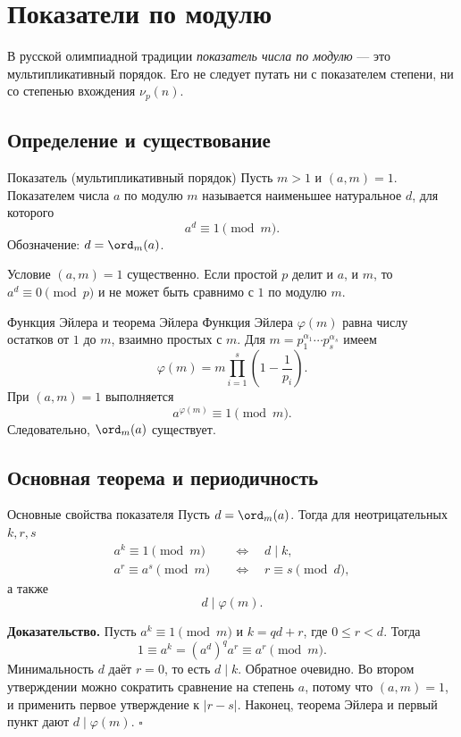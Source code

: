 \chapter{Показатели по модулю}

В русской олимпиадной традиции \emph{показатель числа по модулю} ---
это мультипликативный порядок. Его не следует путать ни с показателем
степени, ни со степенью вхождения $\nu_p(n)$.

\section{Определение и существование}

\begin{definitionbox}{Показатель (мультипликативный порядок)}
Пусть $m>1$ и $(a,m)=1$. Показателем числа $a$ по модулю $m$
называется наименьшее натуральное $d$, для которого
\[
  a^d\equiv1\pmod m.
\]
Обозначение: $d=\ord_m(a)$.
\end{definitionbox}

Условие $(a,m)=1$ существенно. Если простой $p$ делит и $a$, и $m$,
то $a^d\equiv0\pmod p$ и не может быть сравнимо с $1$ по модулю $m$.

\begin{theorembox}{Функция Эйлера и теорема Эйлера}
Функция Эйлера $\varphi(m)$ равна числу остатков от $1$ до $m$,
взаимно простых с $m$. Для
$m=p_1^{\alpha_1}\cdots p_s^{\alpha_s}$ имеем
\[
  \varphi(m)=m\prod_{i=1}^{s}\left(1-\frac1{p_i}\right).
\]
При $(a,m)=1$ выполняется
\[
  a^{\varphi(m)}\equiv1\pmod m.
\]
Следовательно, $\ord_m(a)$ существует.
\end{theorembox}

\section{Основная теорема и периодичность}

\begin{theorembox}{Основные свойства показателя}
Пусть $d=\ord_m(a)$. Тогда для неотрицательных $k,r,s$
\begin{align*}
  a^k\equiv1\pmod m
  &\quad\Longleftrightarrow\quad d\mid k,\\
  a^r\equiv a^s\pmod m
  &\quad\Longleftrightarrow\quad r\equiv s\pmod d,
\end{align*}
а также
\[
  d\mid\varphi(m).
\]
\end{theorembox}

\textbf{Доказательство.}
Пусть $a^k\equiv1\pmod m$ и $k=qd+r$, где $0\le r<d$. Тогда
\[
  1\equiv a^k=(a^d)^q a^r\equiv a^r\pmod m.
\]
Минимальность $d$ даёт $r=0$, то есть $d\mid k$. Обратное очевидно.
Во втором утверждении можно сократить сравнение на степень $a$, потому
что $(a,m)=1$, и применить первое утверждение к $|r-s|$. Наконец,
теорема Эйлера и первый пункт дают $d\mid\varphi(m)$. \hfill$\square$

